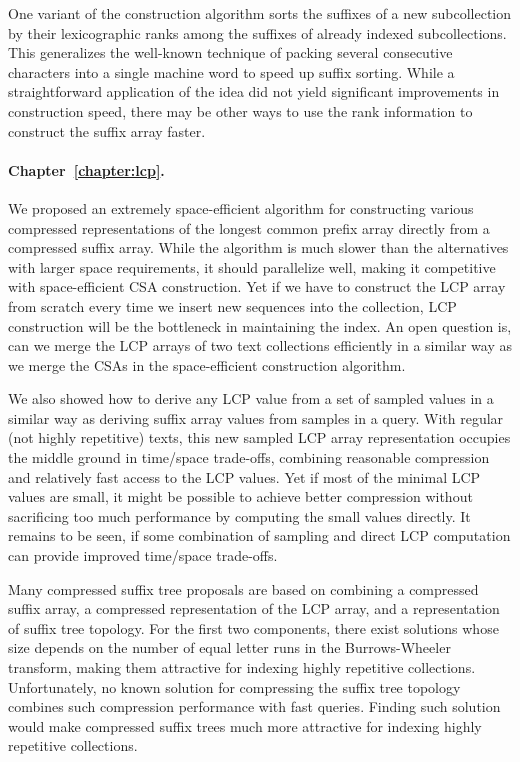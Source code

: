One variant of the construction algorithm sorts the suffixes of a new subcollection by their lexicographic ranks among the suffixes of already indexed subcollections. This generalizes the well-known technique of packing several consecutive characters into a single machine word to speed up suffix sorting. While a straightforward application of the idea did not yield significant improvements in construction speed, there may be other ways to use the rank information to construct the suffix array faster.

\paragraph{Chapter~\ref{chapter:lcp}.}

We proposed an extremely space-efficient algorithm for constructing various compressed representations of the longest common prefix array directly from a compressed suffix array. While the algorithm is much slower than the alternatives with larger space requirements, it should parallelize well, making it competitive with space-efficient CSA construction. Yet if we have to construct the LCP array from scratch every time we insert new sequences into the collection, LCP construction will be the bottleneck in maintaining the index. An open question is, can we merge the LCP arrays of two text collections efficiently in a similar way as we merge the CSAs in the space-efficient construction algorithm.

We also showed how to derive any LCP value from a set of sampled values in a similar way as deriving suffix array values from samples in a \locate{} query. With regular (not highly repetitive) texts, this new sampled LCP array representation occupies the middle ground in time/space trade-offs, combining reasonable compression and relatively fast access to the LCP values. Yet if most of the minimal LCP values are small, it might be possible to achieve better compression without sacrificing too much performance by computing the small values directly. It remains to be seen, if some combination of sampling and direct LCP computation can provide improved time/space trade-offs.

Many compressed suffix tree proposals are based on combining a compressed suffix array, a compressed representation of the LCP array, and a representation of suffix tree topology. For the first two components, there exist solutions whose size depends on the number of equal letter runs in the Burrows-Wheeler transform, making them attractive for indexing highly repetitive collections. Unfortunately, no known solution for compressing the suffix tree topology combines such compression performance with fast queries. Finding such solution would make compressed suffix trees much more attractive for indexing highly repetitive collections.

